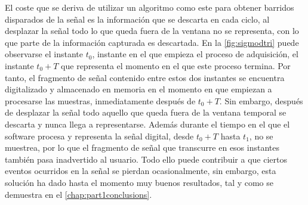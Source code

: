 El coste que se deriva de utilizar un algoritmo como este para obtener
barridos disparados de la señal es la información que se descarta en cada
ciclo, al desplazar la señal todo lo que queda fuera de la ventana no se
representa, con lo que parte de la información capturada es descartada. En
la \cref{fig:sigmodtri} puede observarse el instante $t_0$, instante en el
que empieza el proceso de adquisición, el instante $t_0 + T$ que representa
el momento en el que este proceso termina. Por tanto, el fragmento de señal
contenido entre estos dos instantes se encuentra digitalizado y almacenado
en memoria en el momento en que empiezan a procesarse las muestras,
inmediatamente después de $t_0 + T$. Sin embargo, después de desplazar la
señal todo aquello que queda fuera de la ventana temporal se descarta y
nunca llega a representarse. Además durante el tiempo en el que el software
procesa y representa la señal digital, desde $t_0 + T$ hasta $t_1$, no se
muestrea, por lo que el fragmento de señal que transcurre en esos instantes
también pasa inadvertido al usuario. Todo ello puede contribuir a que
ciertos eventos ocurridos en la señal se pierdan ocasionalmente, sin
embargo, esta solución ha dado hasta el momento muy buenos resultados, tal
y como se demuestra en el \cref{chap:part1conclusions}.
